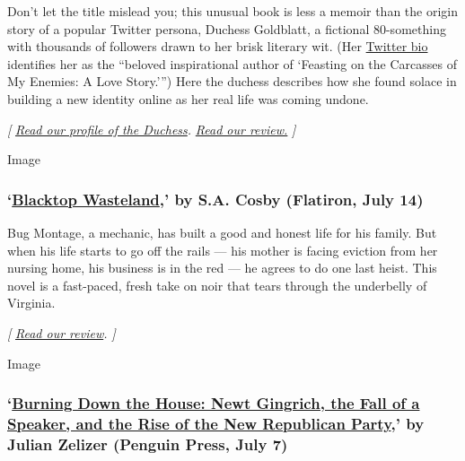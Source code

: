 Don't let the title mislead you; this unusual book is less a memoir than
the origin story of a popular Twitter persona, Duchess Goldblatt, a
fictional 80-something with thousands of followers drawn to her brisk
literary wit. (Her \href{https://twitter.com/duchessgoldblat}{Twitter
bio} identifies her as the ``beloved inspirational author of `Feasting
on the Carcasses of My Enemies: A Love Story.''') Here the duchess
describes how she found solace in building a new identity online as her
real life was coming undone.

\emph{{[}}
\href{https://www.nytimes3xbfgragh.onion/2020/07/01/books/becoming-duchess-goldblatt-memoir.html}{\emph{Read
our profile of the Duchess}}\emph{. \textbar{}}
\href{https://www.nytimes3xbfgragh.onion/2020/07/07/books/review/becoming-duchess-goldblatt-anonymous.html}{\emph{Read
our review.}} \emph{{]}}

Image

\hypertarget{blacktop-wasteland-by-sa-cosby-flatiron-july-14}{%
\subsubsection{\texorpdfstring{`\href{https://us.macmillan.com/books/9781250252685}{Blacktop
Wasteland},' by S.A. Cosby (Flatiron, July
14)}{`Blacktop Wasteland,' by S.A. Cosby (Flatiron, July 14)}}\label{blacktop-wasteland-by-sa-cosby-flatiron-july-14}}

Bug Montage, a mechanic, has built a good and honest life for his
family. But when his life starts to go off the rails --- his mother is
facing eviction from her nursing home, his business is in the red --- he
agrees to do one last heist. This novel is a fast-paced, fresh take on
noir that tears through the underbelly of Virginia.

\emph{{[}}
\href{https://www.nytimes3xbfgragh.onion/2020/07/17/books/review/blacktop-wasteland-s-a-crosby.html}{\emph{Read
our review}}\emph{. {]}}

Image

\hypertarget{burning-down-the-house-newt-gingrich-the-fall-of-a-speaker-and-the-rise-of-the-new-republican-party-by-julian-zelizer-penguin-press-july-7}{%
\subsubsection{\texorpdfstring{`\href{https://www.penguinrandomhouse.com/books/318517/burning-down-the-house-by-julian-e-zelizer/}{Burning
Down the House: Newt Gingrich, the Fall of a Speaker, and the Rise of
the New Republican Party},' by Julian Zelizer (Penguin Press, July
7)}{`Burning Down the House: Newt Gingrich, the Fall of a Speaker, and the Rise of the New Republican Party,' by Julian Zelizer (Penguin Press, July 7)}}\label{burning-down-the-house-newt-gingrich-the-fall-of-a-speaker-and-the-rise-of-the-new-republican-party-by-julian-zelizer-penguin-press-july-7}}

